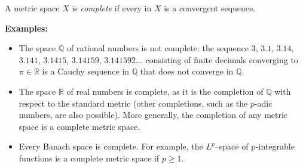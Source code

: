 \documentclass{article}
\begin{document}
A metric space $X$ is {\em complete} if every  in $X$ is a convergent sequence.

{\bf Examples:}


\begin{itemize}
\item The space $\mathbb{Q}$ of rational numbers is not complete: the sequence $3$, $3.1$, $3.14$, $3.141$, $3.1415$, $3.14159$, $3.141592\ldots$ consisting of finite decimals converging to $\pi \in \mathbb{R}$ is a Cauchy sequence in $\mathbb{Q}$ that does not converge in $\mathbb{Q}$.
\item The space $\mathbb{R}$ of real numbers is complete, as it is the completion of $\mathbb{Q}$ with respect to the standard metric (other completions, such as the $p$-adic numbers, are also possible). More generally, the completion of any metric space is a complete metric space.
\item Every Banach space is complete. For example, the $L^p$--space of p-integrable functions is a complete metric space if $p \geq 1$.
\end{itemize}
\end{document}
